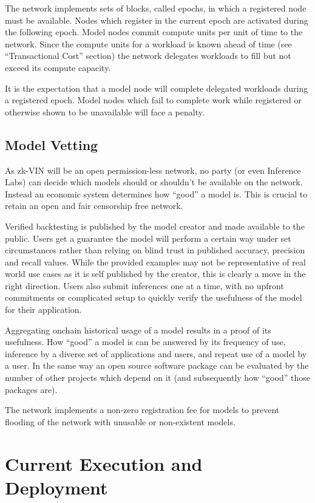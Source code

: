 \documentclass[conference]{IEEEtran}
\begin{document}
The network implements sets of blocks, called epochs, in which a registered node must be available. Nodes which register in the current epoch are activated during the following epoch. Model nodes commit compute units per unit of time to the network. Since the compute units for a workload is known ahead of time (see “Transactional Cost” section) the network delegates workloads to fill but not exceed its compute capacity.

It is the expectation that a model node will complete delegated workloads during a registered epoch. Model nodes which fail to complete work while registered or otherwise shown to be unavailable will face a penalty.

\subsection{Model Vetting}

As zk-VIN will be an open permission-less network, no party (or even Inference Labs) can decide which models should or shouldn’t be available on the network. Instead an economic system determines how “good” a model is. This is crucial to retain an open and fair censorship free network.

Verified backtesting is published by the model creator and made available to the public. Users get a guarantee the model will perform a certain way under set circumstances rather than relying on blind trust in published accuracy, precision and recall values. While the provided examples may not be representative of real world use cases as it is self published by the creator, this is clearly a move in the right direction. Users also submit inferences one at a time, with no upfront commitments or complicated setup to quickly verify the usefulness of the model for their application.

Aggregating onchain historical usage of a model results in a proof of its usefulness. How “good” a model is can be answered by its frequency of use, inference by a diverse set of applications and users, and repeat use of a model by a user. In the same way an open source software package can be evaluated by the number of other projects which depend on it (and subsequently how “good” those packages are).

The network implements a non-zero registration fee for models to prevent flooding of the network with unusable or non-existent models.


\section{Current Execution and Deployment}
\end{document}
